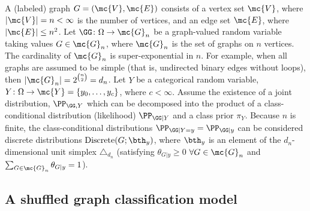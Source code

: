 \documentclass[10pt,journal,cspaper,compsoc]{IEEEtran}
\begin{document}
A (labeled) graph $G=(\mc{V},\mc{E})$ consists of a vertex set $\mc{V}$, where $|\mc{V}|=n < \infty$ is the number of vertices, and an edge set $\mc{E}$, where $|\mc{E}| \leq n^2$.
Let $\GG\colon \Omega \to \mc{G}_n$ be a graph-valued random variable taking values $G\in \mc{G}_n$, where $\mc{G}_n$ is the set of graphs on $n$ vertices. The cardinality of $\mc{G}_n$ is super-exponential in $n$.  For example, when all graphs are assumed to be simple (that is, undirected binary edges without loops), then $|\mc{G}_n|=2^{\binom{n}{2}}=d_n$. 
Let $Y$ be a categorical random variable, $Y\colon \Omega \to \mc{Y}=\{y_0,\ldots, y_{c}\}$, where $c< \infty$.  Assume the existence of a joint distribution, $\PP_{\GG,Y}$ which can be decomposed into the product of a class-conditional distribution (likelihood) $\PP_{\GG|Y}$ and a class prior $\pi_Y$. Because $n$ is finite, the class-conditional  distributions $\PP_{\GG | Y=y}=\PP_{\GG|y}$ can be considered discrete distributions $\text{Discrete}(G; \bth_y)$, where $\bth_y$ is an element of the $d_n$-dimensional unit simplex $\triangle_{d_n}$ (satisfying $\theta_{G|y}\geq 0$ $\forall G \in \mc{G}_n$ and $\sum_{G \in \mc{G}_n} \theta_{G|y}=1$).



\subsection{A shuffled graph classification model} %
\label{sub:a_shuffled_graph_classification_model}

\end{document}
